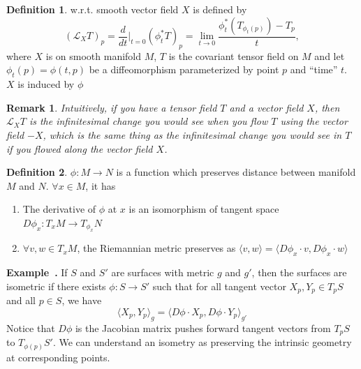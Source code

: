 \documentclass[a4paper]{article}
\theoremstyle{definition}
\newtheorem{definition}{Definition}
\theoremstyle{plain}
\newtheorem{remark}{Remark}
\newenvironment{example}[1][]{\refstepcounter{example}\par\medskip
   \noindent \textbf{Example~\theexample. #1} \rmfamily}{\medskip}
\newcounter{example}{Example}
\begin{document}
\begin{definition}
 w.r.t. smooth vector field $X$ is defined by
\begin{equation*}
    (\mathcal{L}_XT)_p=\frac{d}{dt}\bigg\rvert_{t=0}(\phi^*_tT)_p=\lim_{t\rightarrow0}\frac{\phi^*_t(T_{\phi_t(p)})-T_p}{t},
\end{equation*}
where $X$ is on smooth manifold $M$, $T$ is the covariant tensor field on $M$ and let $\phi_t(p)=\phi(t,p)$ be a diffeomorphism parameterized by point $p$ and ``time'' $t$. $X$ is induced by $\phi$
\end{definition}

\begin{remark}
Intuitively, if you have a tensor field $T$ and a vector field $X$, then $\mathcal{L}_XT$ is the infinitesimal change you would see when you flow $T$ using the vector field $-X$, which is the same thing as the infinitesimal change you would see in $T$ if you flowed along the vector field $X$.
\end{remark}

\begin{definition}\label{def:isometry}
 $\phi:M\rightarrow N$ is a function which preserves distance between manifold $M$ and $N$. $\forall x\in M$, it has
\begin{enumerate}
    \item The derivative of $\phi$ at $x$ is an isomorphism of tangent space $D\phi_x:T_xM\rightarrow T_{\phi_x}N$
    \item $\forall v,w \in T_xM$, the Riemannian metric preserves as $\langle v,w\rangle=\langle D\phi_x\cdot v,D\phi_x\cdot w\rangle$
\end{enumerate}
\end{definition}

\begin{example}\cite{stanford3}
If $S$ and $S'$ are surfaces with metric $g$ and $g'$, then the surfaces are isometric if there exists $\phi:S\rightarrow S'$ such that for all tangent vector $X_p,Y_p\in T_pS$ and all $p\in S$, we have
\begin{equation*}
    \langle X_p,Y_p\rangle_g=\langle D\phi\cdot X_p,D\phi\cdot Y_p\rangle_{g'}
\end{equation*}
Notice that $D\phi$ is the Jacobian matrix pushes forward tangent vectors from $T_pS$ to $T_{\phi(p)}S'$. We can understand an isometry as preserving the intrinsic geometry at corresponding points.
\end{example}
\end{document}
